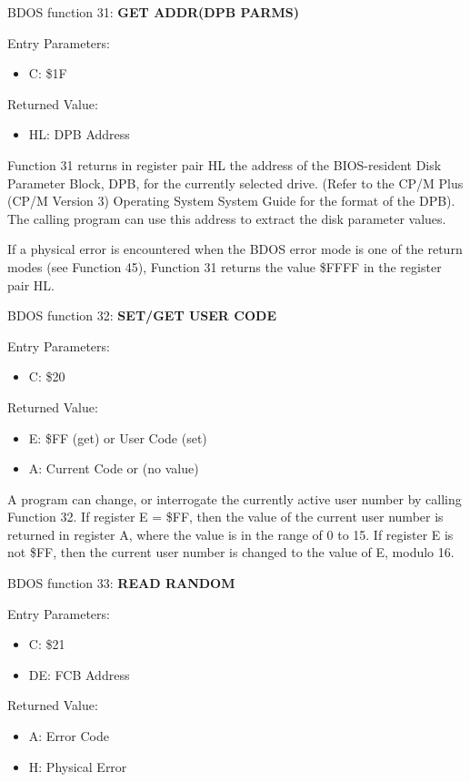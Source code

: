 BDOS function 31: \textbf{GET ADDR(DPB PARMS)}

Entry Parameters:
\begin{itemize}
\item[] C: \$1F
\end{itemize}

Returned Value:
\begin{itemize}
\item[] HL: DPB Address
\end{itemize}

Function 31 returns in register pair HL the address of the
BIOS-resident Disk Parameter Block, DPB, for the currently selected
drive. (Refer to the CP/M Plus (CP/M Version 3) Operating System
System Guide for the format of the DPB). The calling program can use
this address to extract the disk parameter values.

If a physical error is encountered when the BDOS error mode is one of
the return modes (see Function 45), Function 31 returns the value
\$FFFF in the register pair HL.

BDOS function 32: \textbf{SET/GET USER CODE}

Entry Parameters:
\begin{itemize}
\item[] C: \$20
\end{itemize}

Returned Value:
\begin{itemize}
\item[] E: \$FF (get) or User Code (set)
\item[] A: Current Code or (no value)
\end{itemize}

A program can change, or interrogate the currently active user number
by calling Function 32. If register E = \$FF, then the value of the
current user number is returned in register A, where the value is in
the range of 0 to 15. If register E is not \$FF, then the current user
number is changed to the value of E, modulo 16.

BDOS function 33: \textbf{READ RANDOM}

Entry Parameters:
\begin{itemize}
\item[] C: \$21
\item[] DE: FCB Address
\end{itemize}

Returned Value:
\begin{itemize}
\item[] A: Error Code
\item[] H: Physical Error
\end{itemize}

